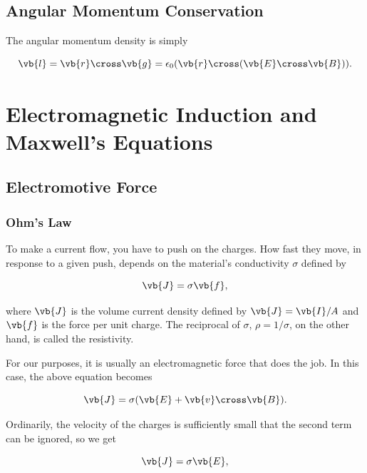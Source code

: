 \documentclass[english,a4paper,12pt]{report}
\begin{document}


\section{Angular Momentum Conservation}

The angular momentum density is simply 

\begin{equation}
    \vb{l} = \vb{r} \cross \vb{g} = \epsilon_0 (\vb{r} \cross (\vb{E} \cross \vb{B} )).
\end{equation}


\chapter{Electromagnetic Induction and Maxwell's Equations}

\section{Electromotive Force}

\subsection{Ohm's Law}

To make a current flow, you have to push on the charges. How fast they move, in response to a given push, depends on the material's conductivity \(\sigma \) defined by 

\begin{equation}
    \vb{J} = \sigma \vb{f} , \label{ohm} 
\end{equation}

where \(\vb{J} \) is the volume current density defined by \(\vb{J} = \vb{I} /A \) and \(\vb{f} \) is the force per unit charge. The reciprocal of \(\sigma \), \(\rho = 1 /\sigma  \), on the other hand, is called the resistivity.  

For our purposes, it is usually an electromagnetic force that does the job. In this case, the above equation becomes

\begin{equation}
    \vb{J} = \sigma (\vb{E} + \vb{v} \cross \vb{B} ).
\end{equation}

Ordinarily, the velocity of the charges is sufficiently small that the second term can be ignored, so we get

\begin{equation}
    \vb{J} = \sigma \vb{E} ,
\end{equation}
\end{document}
